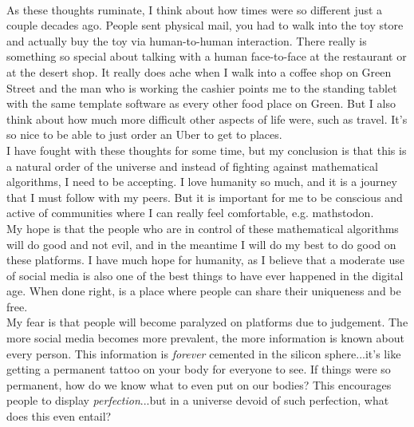 \documentclass[12pt]{article}
\theoremstyle{definition} %
\theoremstyle{plain} %
\begin{document}
\\
As these thoughts ruminate, I think about how times were so different just a couple decades ago. People sent physical mail, you had to walk into the toy store and actually buy the toy via human-to-human interaction. There really is something so special about talking with a human face-to-face at the restaurant or at the desert shop. It really does ache when I walk into a coffee shop on Green Street and the man who is working the cashier points me to the standing tablet with the same template software as every other food place on Green. But I also think about how much more difficult other aspects of life were, such as travel. It's so nice to be able to just order an Uber to get to places. 
\\
I have fought with these thoughts for some time, but my conclusion is that this is a natural order of the universe and instead of fighting against mathematical algorithms, I need to be accepting. I love humanity so much, and it is a journey that I must follow with my peers. But it is important for me to be conscious and active of communities where I can really feel comfortable, e.g. mathstodon. 
\\
My hope is that the people who are in control of these mathematical algorithms will do good and not evil, and in the meantime I will do my best to do good on these platforms. I have much hope for humanity, as I believe that a moderate use of social media is also one of the best things to have ever happened in the digital age. When done right, is a place where people can share their uniqueness and be free. 
\\
My fear is that people will become paralyzed on platforms due to judgement. The more social media becomes more prevalent, the more information is known about every person. This information is \emph{forever} cemented in the silicon sphere...it's like getting a permanent tattoo on your body for everyone to see. If things were so permanent, how do we know what to even put on our bodies? This encourages people to display \emph{perfection}...but in a universe devoid of such perfection, what does this even entail?
\end{document}
